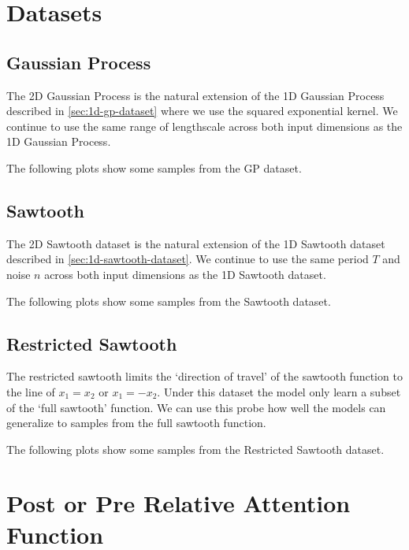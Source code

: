 \documentclass[../../main.tex]{subfiles}
\begin{document}
\section{Datasets}

\subsection{Gaussian Process}

The 2D Gaussian Process is the natural extension of the 1D Gaussian Process described in \autoref{sec:1d-gp-dataset} where we use the squared exponential kernel. We continue to use the same range of lengthscale across both input dimensions as the 1D Gaussian Process. 

The following plots show some samples from the GP dataset.



\subsection{Sawtooth}

The 2D Sawtooth dataset is the natural extension of the 1D Sawtooth dataset described in \autoref{sec:1d-sawtooth-dataset}. We continue to use the same period $T$ and noise $n$ across both input dimensions as the 1D Sawtooth dataset.

The following plots show some samples from the Sawtooth dataset.


\subsection{Restricted Sawtooth}

The restricted sawtooth limits the `direction of travel' of the sawtooth function to the line of $x_1 = x_2$ or $x_1 = -x_2$. Under this dataset the model only learn a subset of the `full sawtooth' function. We can use this probe how well the models can generalize to samples from the full sawtooth function.

The following plots show some samples from the Restricted Sawtooth dataset.

\section{Post or Pre Relative Attention Function}

\end{document}
